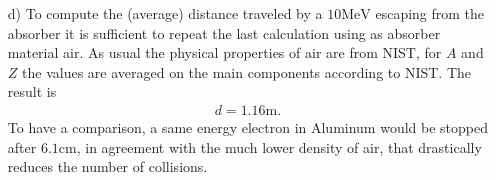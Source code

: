 \documentclass[10pt,a4paper]{article}
\begin{document}
\begin{enumerate}
\begin{itemize}
\item[d)] To compute the (average) distance traveled by a $10\si{\mega\electronvolt}$ escaping from the absorber it is sufficient to repeat the last calculation using as absorber material air. As usual the physical properties of air are from NIST, for $A$ and $Z$ the values are averaged on the main components according to NIST. The result is
\begin{align*}
d = 1.16\si{\metre}.
\end{align*}
To have a comparison, a same energy electron in Aluminum would be stopped after $6.1\si{\centi\metre}$, in agreement with the much lower density of air, that drastically reduces the number of collisions.

\end{itemize}

\end{enumerate}
\end{document}
